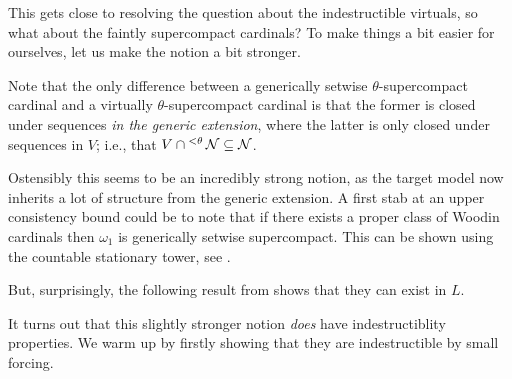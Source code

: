 \documentclass[../../main]{subfiles}
\begin{document}

This gets close to resolving the question about the indestructible virtuals, so what about the faintly supercompact cardinals? To make things a bit easier for ourselves, let us make the notion a bit stronger.


Note that the only difference between a generically setwise $\theta$-supercompact cardinal and a virtually $\theta$-supercompact cardinal is that the former is closed under sequences \textit{in the generic extension}, where the latter is only closed under sequences in $V$; i.e., that $V\cap{^{<\theta}}\operatorname{\mathcal N}\subseteq\operatorname{\mathcal N}$.

\qquad Ostensibly this seems to be an incredibly strong notion, as the target model now inherits a lot of structure from the generic extension. A first stab at an upper consistency bound could be to note that if there exists a proper class of Woodin cardinals then $\omega_1$ is generically setwise supercompact. This can be shown using the countable stationary tower, see \cite{stationary-tower}.

\qquad But, surprisingly, the following result from \cite{usuba} shows that they can exist in $L$.


It turns out that this slightly stronger notion \textit{does} have indestructiblity properties. We warm up by firstly showing that they are indestructible by small forcing.
\end{document}
